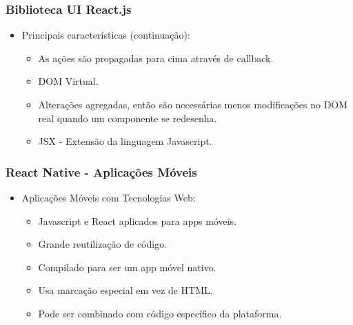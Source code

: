 \documentclass{beamer}
\begin{document}
      \begin{frame}
      \frametitle{Biblioteca UI React.js}
      
      \begin{itemize}
          \item Principais características (continuação):
          \begin{itemize}
              \item As ações são propagadas para cima através de callback.
              \item DOM Virtual.
              \item Alterações agregadas, então são necessárias menos modificações no DOM real quando um componente se redesenha.
              \item JSX - Extensão da linguagem Javascript.
          \end{itemize}
      \end{itemize}
      
      \end{frame}
      
      \begin{frame}
            \frametitle{React Native - Aplicações Móveis}
            
            \begin{itemize}
                \item Aplicações Móveis com Tecnologias Web:
                \begin{itemize}
                    \item Javascript e React aplicados para apps móveis.
                    \item Grande reutilização de código.
                    \item Compilado para ser um app móvel nativo.
                    \item Usa marcação especial em vez de HTML.
                    \item Pode ser combinado com código específico da plataforma.
                \end{itemize}
            \end{itemize}
            
            \end{frame}
            
\end{document}
